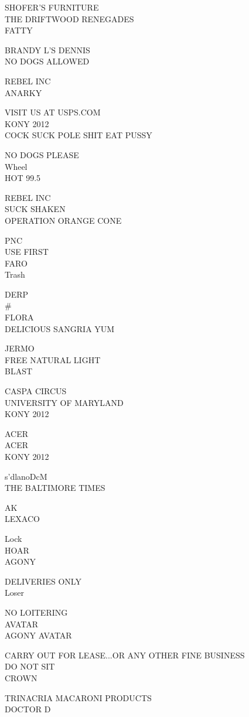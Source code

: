 \documentclass[10pt,letterpaper]{article}
\begin{document}
SHOFER'S FURNITURE\\
THE DRIFTWOOD RENEGADES\\
FATTY

BRANDY L'S DENNIS\\
NO DOGS ALLOWED

REBEL INC\\
ANARKY

VISIT US AT USPS.COM\\
KONY 2012\\
COCK SUCK POLE SHIT EAT PUSSY

NO DOGS PLEASE\\
Wheel\\
HOT 99.5

REBEL INC\\
SUCK SHAKEN\\
OPERATION ORANGE CONE

PNC\\
USE FIRST\\
FARO\\
Trash

DERP\\
\#\\
FLORA\\
DELICIOUS SANGRIA YUM

JERMO\\
FREE NATURAL LIGHT\\
BLAST

CASPA CIRCUS\\
UNIVERSITY OF MARYLAND\\
KONY 2012

ACER\\
ACER\\
KONY 2012

s'dlanoDcM\\
THE BALTIMORE TIMES

AK\\
LEXACO

Lock\\
HOAR\\
AGONY

DELIVERIES ONLY\\
Loser

NO LOITERING\\
AVATAR\\
AGONY AVATAR

CARRY OUT FOR LEASE...OR ANY OTHER FINE BUSINESS\\
DO NOT SIT\\
CROWN

TRINACRIA MACARONI PRODUCTS\\
DOCTOR D
\end{document}
